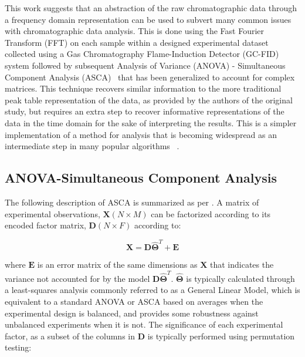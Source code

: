\documentclass[preprint,12pt]{elsarticle}
\begin{document}
This work suggests that an abstraction of the raw chromatographic data through a frequency domain representation can be used to subvert many common issues with chromatographic data analysis. This is done using the Fast Fourier Transform (FFT) on each sample within a designed experimental dataset collected using a Gas Chromatography Flame-Induction Detector (GC-FID) system followed by subsequent Analysis of Variance (ANOVA) - Simultaneous Component Analysis (ASCA)~\cite{smilde2005anova} that has been generalized to account for complex matrices. This technique recovers similar information to the more traditional peak table representation of the data, as provided by the authors of the original study, but requires an extra step to recover informative representations of the data in the time domain for the sake of interpreting the results. This is a simpler implementation of a method for analysis that is becoming widespread as an intermediate step in many popular algorithms ~\cite{schneide2023shift,schneide2024shift,yu2023parasias}.


\subsection{ANOVA-Simultaneous Component Analysis}

The following description of ASCA is summarized as per \cite{camacho2023permutation}. A matrix of experimental observations, $\mathbf{X} (N \times M)$ can be factorized according to its encoded factor matrix, $\mathbf{D} (N \times F)$ according to:

\begin{equation}
    \mathbf{X} = \mathbf{D} \mathbf{\hat{\Theta}}^T + \mathbf{E}
\end{equation}

\noindent where $\mathbf{E}$ is an error matrix of the same dimensions as $\mathbf{X}$ that indicates the variance not accounted for by the model $\mathbf{D} \mathbf{\hat{\Theta}}^T$. $\mathbf{\hat{\Theta}}$ is typically calculated through a least-squares analysis commonly referred to as a General Linear Model, which is equivalent to a standard ANOVA or ASCA based on averages \cite{smilde2005anova} when the experimental design is balanced, and provides some robustness against unbalanced experiments when it is not. The significance of each experimental factor, as a subset of the columns in $\mathbf{D}$ is typically performed using permutation testing:
\end{document}
